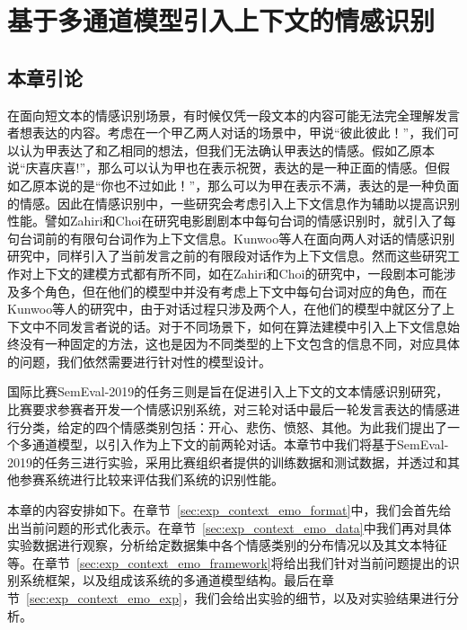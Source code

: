 \chapter{基于多通道模型引入上下文的情感识别}
\label{cha:exp_context_emo}

\section{本章引论}

在面向短文本的情感识别场景，有时候仅凭一段文本的内容可能无法完全理解发言者想表达的内容。考虑在一个甲乙两人对话的场景中，甲说“彼此彼此！”，我们可以认为甲表达了和乙相同的想法，但我们无法确认甲表达的情感。假如乙原本说“庆喜庆喜!”，那么可以认为甲也在表示祝贺，表达的是一种正面的情感。但假如乙原本说的是“你也不过如此！”，那么可以为甲在表示不满，表达的是一种负面的情感。因此在情感识别中，一些研究会考虑引入上下文信息作为辅助以提高识别性能。譬如Zahiri和Choi\cite{Zahiri2017Emotion}在研究电影剧剧本中每句台词的情感识别时，就引入了每句台词前的有限句台词作为上下文信息。Kunwoo等人\cite{hazarika2018conversational}在面向两人对话的情感识别研究中，同样引入了当前发言之前的有限段对话作为上下文信息。然而这些研究工作对上下文的建模方式都有所不同，如在Zahiri和Choi\cite{Zahiri2017Emotion}的研究中，一段剧本可能涉及多个角色，但在他们的模型中并没有考虑上下文中每句台词对应的角色，而在Kunwoo等人\cite{hazarika2018conversational}的研究中，由于对话过程只涉及两个人，在他们的模型中就区分了上下文中不同发言者说的话。对于不同场景下，如何在算法建模中引入上下文信息始终没有一种固定的方法，这也是因为不同类型的上下文包含的信息不同，对应具体的问题，我们依然需要进行针对性的模型设计。

国际比赛SemEval-2019的任务三\cite{SemEval2019Task3}则是旨在促进引入上下文的文本情感识别研究，比赛要求参赛者开发一个情感识别系统，对三轮对话中最后一轮发言表达的情感进行分类，给定的四个情感类别包括：开心、悲伤、愤怒、其他。为此我们提出了一个多通道模型，以引入作为上下文的前两轮对话。本章节中我们将基于SemEval-2019的任务三进行实验，采用比赛组织者提供的训练数据和测试数据，并透过和其他参赛系统进行比较来评估我们系统的识别性能。

本章的内容安排如下。在章节~\ref{sec:exp_context_emo_format}中，我们会首先给出当前问题的形式化表示。在章节~\ref{sec:exp_context_emo_data}中我们再对具体实验数据进行观察，分析给定数据集中各个情感类别的分布情况以及其文本特征等。在章节~\ref{sec:exp_context_emo_framework}将给出我们针对当前问题提出的识别系统框架，以及组成该系统的多通道模型结构。最后在章节~\ref{sec:exp_context_emo_exp}，我们会给出实验的细节，以及对实验结果进行分析。

